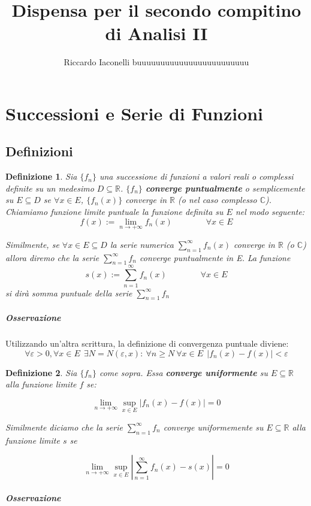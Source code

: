 \documentclass[a4paper,12pt]{article}
\newtheorem{defi}{Definizione}
\begin{document}
\begin{titlepage}
\title{Dispensa per il secondo compitino di Analisi II}
\author{Riccardo Iaconelli buuuuuuuuuuuuuuuuuuuuuuuu}
\maketitle
\end{titlepage}

\begin{titlepage}
\tableofcontents
\end{titlepage}

\section{Successioni e Serie di Funzioni}
\subsection{Definizioni}
\begin{defi}
Sia $\{ f_n\} $  una successione di funzioni a valori reali o complessi definite su un medesimo $D \subseteq \mathbb{R}$.
 $\{ f_n\} $ \textbf{converge puntualmente} o semplicemente su $ E \subseteq D $ se $\forall x \in E$, $\{f_n(x)\}$ converge in $\mathbb{R}$ (o nel caso complesso $\mathbb{C}$). Chiamiamo funzione limite puntuale la funzione definita su $E$ nel modo seguente: 
 $$f(x):=\lim_{n\to+\infty} f_n(x) \qquad \qquad \forall x \in E $$

Similmente, se $\forall x \in E \subseteq D$ la serie numerica $\sum_{n=1}^{\infty} f_n(x)$ converge in $\mathbb{R}$ (o $\mathbb{C}$)  allora diremo che la serie  $\sum_{n=1}^{\infty} f_n$ converge puntualmente in E. La funzione
\begin{displaymath}
s(x):= \sum_{n=1}^{\infty} f_n(x) \qquad \qquad \forall x \in E
\end{displaymath}
si dirà somma puntuale della serie $\sum_{n=1}^{\infty} f_n$
\end{defi}


\subparagraph*{Osservazione}
Utilizzando un'altra scrittura, la definizione di convergenza puntuale diviene:
 $$\forall \varepsilon>0, \forall x \in E\ \ \exists N=N(\varepsilon, x):\ \forall n \geq N\ \forall x\in E\ \ |f_n(x) - f(x)| < \varepsilon$$ 
\begin{defi}
Sia $\{ f_n\} $ come sopra. Essa \textbf{ converge uniformente} su $E \subseteq \mathbb{R} $ alla funzione limite $f$ se:
 
$$ \lim_{n\to+\infty} \displaystyle \sup_{x \in E} |f_n\left(x\right)-f\left(x\right)| = 0$$


Similmente diciamo che la serie $\sum_{n=1}^{\infty} f_n$ converge uniformemente su $E \subseteq \mathbb{R} $ alla funzione limite $s$ se

$$ \lim_{n\to+\infty}  \sup_{x \in E} \displaystyle \left|\sum_{n=1}^{\infty} f_n(x)-s(x)\right| = 0 $$

\end{defi}
\subparagraph*{Osservazione}
 
\end{document}
